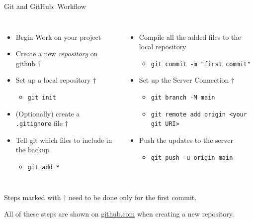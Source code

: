 
\begin{frame}[fragile]{Git and GitHub: Workflow}
%
\begin{columns}[T]
\begin{itemize}
\item Begin Work on your project
\item Create a new \emph{repository} on github $\dagger$
\item Set up a local repository $\dagger$
	\begin{itemize}
	\item \texttt{git init}
	\end{itemize}
\item (Optionally) create a \texttt{.gitignore} file $\dagger$
\item Tell git which files to include in the backup
	\begin{itemize}
	\item \texttt{git add *}
	\end{itemize}
\end{itemize}

\begin{itemize}
\item Compile all the added files to the local repository
	\begin{itemize}
	\item \texttt{git commit -m "first commit"}
	\end{itemize}
\item Set up the Server Connection $\dagger$
	\begin{itemize}
	\item \texttt{git branch -M main}
	\item \texttt{git remote add origin <your git URI>}
	\end{itemize}
\item Push the updates to the server
	\begin{itemize}
	\item \texttt{git push -u origin main}
	\end{itemize}
\end{itemize}
\end{columns}
%

\vspace{9pt}
Steps marked with $\dagger$ need to be done only for the first commit.

All of these steps are shown on \url{github.com} when creating a new repository.
%
\end{frame}